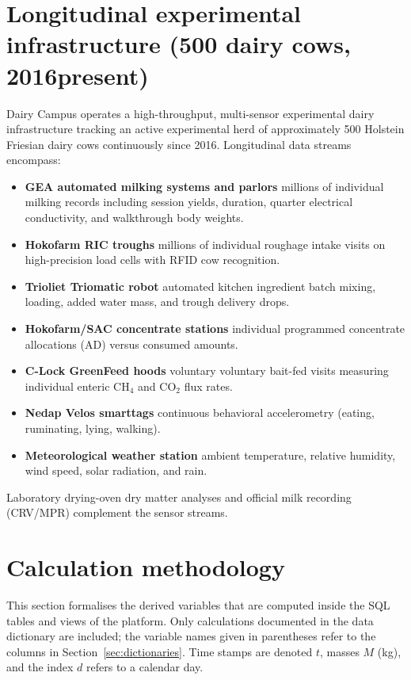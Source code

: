 \documentclass[10pt,a4paper]{article}
\begin{document}
\section{Longitudinal experimental infrastructure (500 dairy cows, 2016\textendash present)}
Dairy Campus operates a high-throughput, multi-sensor experimental dairy infrastructure tracking
an active experimental herd of approximately 500 Holstein Friesian dairy cows continuously since 2016.
Longitudinal data streams encompass:
\begin{itemize}
  \item \textbf{GEA automated milking systems and parlors} \textendash{} millions of individual milking records including session yields, duration, quarter electrical conductivity, and walkthrough body weights.
  \item \textbf{Hokofarm RIC troughs} \textendash{} millions of individual roughage intake visits on high-precision load cells with RFID cow recognition.
  \item \textbf{Trioliet Triomatic robot} \textendash{} automated kitchen ingredient batch mixing, loading, added water mass, and trough delivery drops.
  \item \textbf{Hokofarm/SAC concentrate stations} \textendash{} individual programmed concentrate allocations (A\textendash D) versus consumed amounts.
  \item \textbf{C-Lock GreenFeed hoods} \textendash{} voluntary voluntary bait-fed visits measuring individual enteric $\mathrm{CH}_4$ and $\mathrm{CO}_2$ flux rates.
  \item \textbf{Nedap Velos smarttags} \textendash{} continuous behavioral accelerometry (eating, ruminating, lying, walking).
  \item \textbf{Meteorological weather station} \textendash{} ambient temperature, relative humidity, wind speed, solar radiation, and rain.
\end{itemize}
Laboratory drying-oven dry matter analyses and official milk recording (CRV/MPR)
complement the sensor streams.


\section{Calculation methodology}\label{sec:methods}

This section formalises the derived variables that are computed inside the SQL
tables and views of the platform. Only calculations documented in the data
dictionary are included; the variable names given in parentheses refer to the
columns in Section~\ref{sec:dictionaries}. Time stamps are denoted $t$, masses
$M$ (\si{\kilogram}), and the index $d$ refers to a calendar day.
\end{document}
